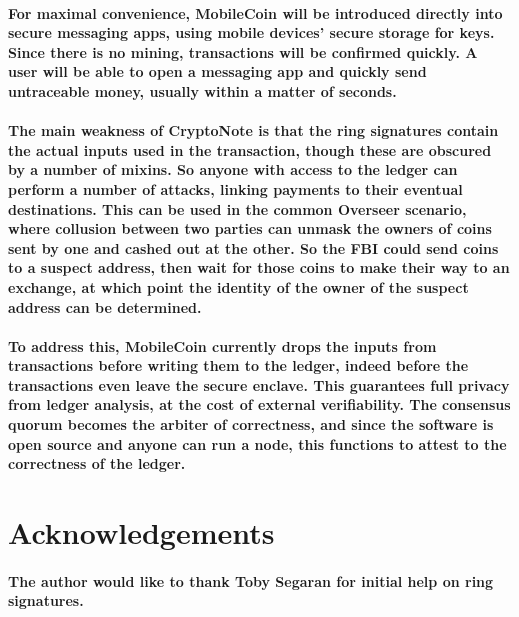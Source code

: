 \documentclass{article}
\begin{document}
\paragraph{For maximal convenience, MobileCoin will be introduced directly into secure messaging apps, using mobile devices’ secure storage for keys.  Since there is no mining, transactions will be confirmed quickly.  A user will be able to open a messaging app and quickly send untraceable money, usually within a matter of seconds.}

\paragraph{The main weakness of CryptoNote is that the ring signatures contain the actual inputs used in the transaction, though these are obscured by a number of mixins.  So anyone with access to the ledger can perform a number of attacks, linking payments to their eventual destinations.  This can be used in the common Overseer scenario, where collusion between two parties can unmask the owners of coins sent by one and cashed out at the other.  So the FBI could send coins to a suspect address, then wait for those coins to make their way to an exchange, at which point the identity of the owner of the suspect address can be determined.}

\paragraph{To address this, MobileCoin currently drops the inputs from transactions before writing them to the ledger, indeed before the transactions even leave the secure enclave.  This guarantees full privacy from ledger analysis, at the cost of external verifiability.  The consensus quorum becomes the arbiter of correctness, and since the software is open source and anyone can run a node, this functions to attest to the correctness of the ledger.}



\section{Acknowledgements}

\paragraph{The author would like to thank Toby Segaran for initial help on ring signatures.}
\end{document}
